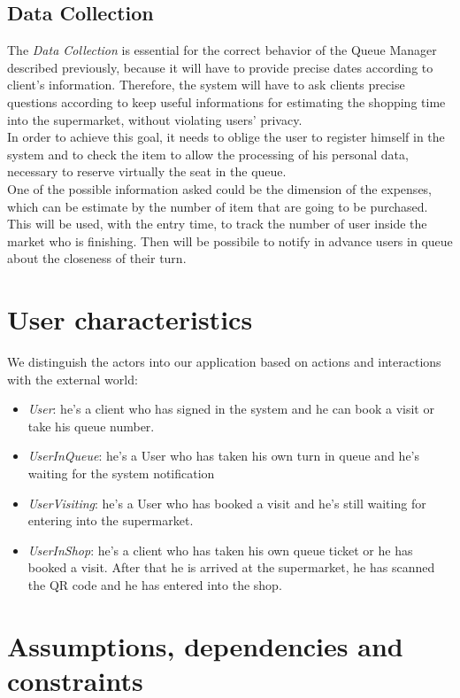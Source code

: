 \subsection{Data Collection}
The \textit{Data Collection} is essential for the correct behavior of the Queue Manager described previously, because it will have to provide precise dates according to client’s information. 
Therefore, the system will have to ask clients precise questions according to keep useful informations for estimating the shopping time into the supermarket, without violating users’ privacy. 
\\
In order to achieve this goal, it needs to oblige the user to register himself in the system and to check the item to allow the processing of his personal data, necessary to reserve virtually the seat in the queue.
\\
One of the possible information asked could be the dimension of the expenses, which can be estimate by the number of item that are going to be purchased. This will be used, with the entry time, to track the number of user inside the market who is finishing. Then will be possibile to notify in advance users in queue about the closeness of their turn.

\section{User characteristics}
We distinguish the actors into our application based on actions and interactions with the external world:

\begin{itemize}
\item \textit{User}: he’s a client who has signed in the system and he can book a visit or take his queue number.
\item \textit{UserInQueue}: he’s a User who has taken his own turn in queue and he’s waiting for the system notification
\item \textit{UserVisiting}: he’s a User who has booked a visit and he’s still waiting for entering into the supermarket.
\item \textit{UserInShop}: he’s a client who has taken his own queue ticket or he has booked a visit. After that he is arrived at the supermarket, he has scanned the QR code and he has entered into the shop.
\end{itemize}


\section{Assumptions, dependencies and constraints}
